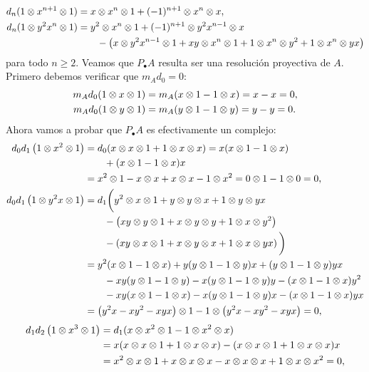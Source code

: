 \documentclass[fleqn,../tesis.tex]{subfiles}
\begin{document}
\begin{align*}
	d_n(1\otimes x^{n + 1} \otimes 1) &= x \otimes x^{n} \otimes 1 + (-1)^{n + 1} \otimes x^{n} \otimes x,\\
	d_n(1\otimes y^2x^{n} \otimes 1) &= y^2 \otimes x^{n} \otimes 1 +  (-1)^{n + 1} \otimes y^2x^{n - 1} \otimes x\\
	&\qquad - \left(x\otimes y^{2}x^{n - 1} \otimes 1 + xy \otimes x^{n} \otimes 1 + 1 \otimes x^{n} \otimes y^2 + 1 \otimes x^{n}\otimes yx\right)
\end{align*}
para todo $n \geq 2$.
Veamos que $P_{\bullet}A$ resulta ser una resolución proyectiva de $A$.
Primero debemos verificar que $m_A d_0 = 0$:
\begin{align*}
	m_A d_0(1\otimes x \otimes 1) &= m_A(x \otimes 1 - 1 \otimes x) = x - x = 0,\\
	m_A d_0(1\otimes y \otimes 1) &= m_A(y \otimes 1 - 1 \otimes y) = y - y = 0.
\end{align*}
Ahora vamos a probar que $P_{\bullet}A$ es efectivamente un complejo:
\begin{align*}
	d_0 d_1\left(1\otimes x^2 \otimes 1\right) &= d_0(x \otimes x \otimes 1 + 1 \otimes x \otimes x) = x (x \otimes 1 - 1 \otimes x)\\
	&\qquad + (x \otimes 1 - 1 \otimes x)x\\
	&= x^2 \otimes 1 - x \otimes x + x\otimes x - 1 \otimes x^2 = 0 \otimes 1 - 1 \otimes 0 = 0,\\
	d_0 d_1\left(1\otimes y^2x \otimes 1\right) &= d_1\bigg(y^2 \otimes x \otimes 1 + y \otimes y \otimes x  + 1 \otimes y \otimes yx\\
	&\qquad - \left(xy \otimes y \otimes 1 + x \otimes y \otimes y + 1 \otimes x \otimes y^2\right)\\
	&\qquad - \left(xy \otimes x \otimes 1 + x \otimes y \otimes x + 1 \otimes x \otimes yx\right)\bigg)\\
	&= y^2(x \otimes 1 - 1 \otimes x) + y(y \otimes 1 - 1 \otimes y)x  + (y \otimes 1 - 1 \otimes y) yx\\
	&\qquad -xy(y \otimes 1 - 1 \otimes y) - x(y \otimes 1 - 1 \otimes y)y - (x \otimes 1 - 1 \otimes x)y^2\\
	&\qquad -xy(x \otimes 1 - 1 \otimes x) - x(y \otimes 1 - 1 \otimes y)x - (x \otimes 1 - 1 \otimes x)yx\\
	&= \left(y^2x - xy^2 - xyx\right)\otimes 1 - 1 \otimes\left(y^2x - xy^2 - xyx\right)  = 0,
\end{align*}
\begin{align*}
	d_1 d_2\left(1 \otimes x^3 \otimes 1\right) &= d_1(x \otimes x^2 \otimes 1 - 1 \otimes x^2 \otimes x)\\
	&= x(x \otimes x \otimes 1 + 1 \otimes x \otimes x) - (x \otimes x \otimes 1 + 1 \otimes x \otimes x) x\\
	&= x^2 \otimes x \otimes 1 + x \otimes x \otimes x - x \otimes x \otimes x + 1 \otimes x \otimes x^2  = 0,
\end{align*}
\end{document}
